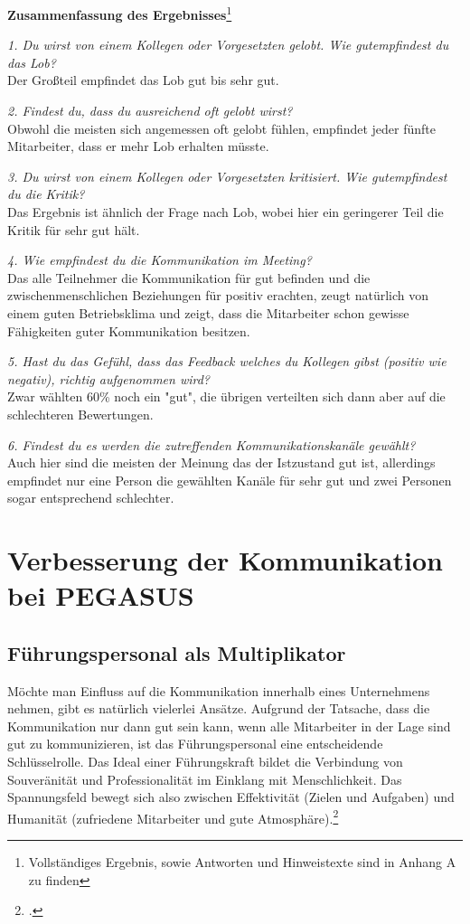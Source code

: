 \documentclass[12pt, DIV9, BCOR9mm, onecolumn, headsepline, ngerman]{scrreprt}
\begin{document}
 
\textbf{Zusammenfassung des Ergebnisses}\footnote{Vollständiges Ergebnis, sowie Antworten und Hinweistexte sind in Anhang A zu finden}

\textit{1. Du wirst von einem Kollegen oder Vorgesetzten gelobt. Wie \glqq gut\grqq empfindest du das Lob?}\\
Der Großteil empfindet das Lob gut bis sehr gut.

\textit{2. Findest du, dass du ausreichend oft gelobt wirst?}\\
Obwohl die meisten sich angemessen oft gelobt fühlen, empfindet jeder fünfte Mitarbeiter, dass er mehr Lob erhalten müsste.

\textit{3. Du wirst von einem Kollegen oder Vorgesetzten kritisiert. Wie \glqq gut\grqq empfindest du die Kritik?}\\
Das Ergebnis ist ähnlich der Frage nach Lob, wobei hier ein geringerer Teil die Kritik für sehr gut hält.

\textit{4. Wie empfindest du die Kommunikation im Meeting?}\\
Das alle Teilnehmer die Kommunikation für gut befinden und die zwischenmenschlichen Beziehungen für positiv erachten, zeugt natürlich von einem guten Betriebsklima und zeigt, dass die Mitarbeiter schon gewisse Fähigkeiten guter Kommunikation besitzen.

\textit{5. Hast du das Gefühl, dass das Feedback welches du Kollegen gibst (positiv wie negativ), richtig aufgenommen wird?}\\
Zwar wählten 60\% noch ein "gut", die übrigen verteilten sich dann aber auf die schlechteren Bewertungen.

\textit{6. Findest du es werden die zutreffenden Kommunikationskanäle gewählt?}\\
Auch hier sind die meisten der Meinung das der Istzustand gut ist, allerdings empfindet nur eine Person die gewählten Kanäle für sehr gut und zwei Personen sogar entsprechend schlechter.


\chapter{Verbesserung der Kommunikation bei PEGASUS}


\section{Führungspersonal als Multiplikator}

Möchte man Einfluss auf die Kommunikation innerhalb eines Unternehmens nehmen, gibt es natürlich vielerlei Ansätze. Aufgrund der Tatsache, dass die Kommunikation nur dann gut sein kann, wenn alle Mitarbeiter in der Lage sind gut zu kommunizieren, ist das Führungspersonal eine entscheidende Schlüsselrolle. Das Ideal einer Führungskraft bildet die Verbindung von Souveränität und Professionalität im Einklang mit Menschlichkeit. Das Spannungsfeld bewegt sich also zwischen Effektivität (Zielen und Aufgaben) und 	Humanität (zufriedene Mitarbeiter und gute Atmosphäre).\footcite[vgl.][S.13ff]{SchulzMiteinander}
\end{document}
